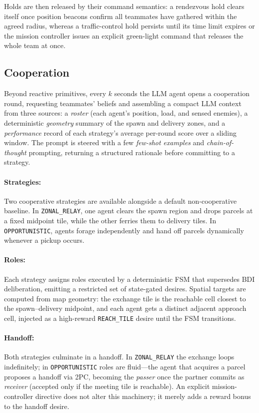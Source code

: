 Holds are then released by their command semantics: a rendezvous hold clears itself once position beacons confirm all teammates have gathered within the agreed radius, whereas a traffic-control hold persists until its time limit expires or the mission controller issues an explicit green-light command that releases the whole team at once.

\subsection{Cooperation}

Beyond reactive primitives, every $k$ seconds the LLM agent opens a cooperation round, requesting teammates' beliefs and assembling a compact LLM context from three sources: a \emph{roster} (each agent's position, load, and sensed enemies), a deterministic \emph{geometry} summary of the spawn and delivery zones, and a \emph{performance} record of each strategy's average per-round score over a sliding window. The prompt is steered with a few \emph{few-shot examples} and \emph{chain-of-thought} prompting, returning a structured rationale before committing to a strategy.

\paragraph{Strategies:}
Two cooperative strategies are available alongside a default non-cooperative baseline.
In \texttt{ZONAL\_RELAY}, one agent clears the spawn region and drops parcels at a fixed midpoint tile, while the other ferries them to delivery tiles.
In \texttt{OPPORTUNISTIC}, agents forage independently and hand off parcels dynamically whenever a pickup occurs.

\paragraph{Roles:}
Each strategy assigns roles executed by a deterministic FSM that supersedes BDI deliberation, emitting a restricted set of state-gated desires. Spatial targets are computed from map geometry: the exchange tile is the reachable cell closest to the spawn--delivery midpoint, and each agent gets a distinct adjacent approach cell, injected as a high-reward \texttt{REACH\_TILE} desire until the FSM transitions.

\paragraph{Handoff:}
Both strategies culminate in a handoff. In \texttt{ZONAL\_RELAY} the exchange loops indefinitely; in \texttt{OPPORTUNISTIC} roles are fluid---the agent that acquires a parcel proposes a handoff via 2PC, becoming the \emph{passer} once the partner commits as \emph{receiver} (accepted only if the meeting tile is reachable). An explicit mission-controller directive does not alter this machinery; it merely adds a reward bonus to the handoff desire.